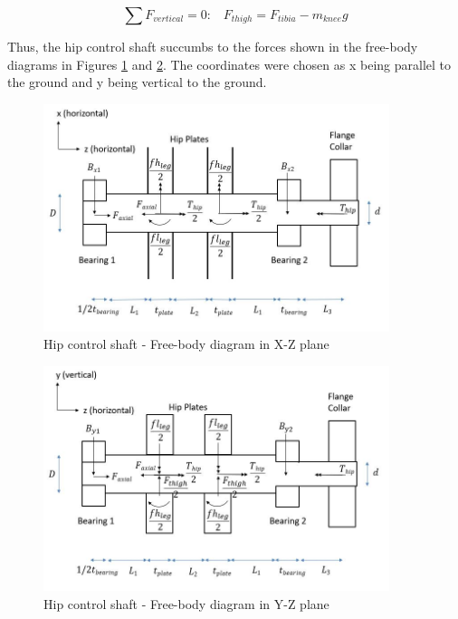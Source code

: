 \begin{equation}
    \sum F_{vertical}=0:\;\;\;F_{thigh}=F_{tibia}-m_{knee} g
    \label{eq:shaft_hip_Fthigh}
\end{equation}

Thus, the hip control shaft succumbs to the forces shown in the free-body diagrams in Figures \ref{fig:shaft_hip_fbd1} and \ref{fig:shaft_hip_fbd2}. The coordinates were chosen as x being parallel to the ground and y being vertical to the ground.

\begin{figure}
    \centering
    \includegraphics[width=0.9\textwidth]{4_Analysis/img/Shafts/ShaftHipXZ.JPG}
    \caption{Hip control shaft - Free-body diagram in X-Z plane}
    \label{fig:shaft_hip_fbd1}
\end{figure}

\begin{figure}
    \centering
    \includegraphics[width=0.9\textwidth]{4_Analysis/img/Shafts/ShaftHipYZ.JPG}
    \caption{Hip control shaft - Free-body diagram in Y-Z plane}
    \label{fig:shaft_hip_fbd2}
\end{figure}


